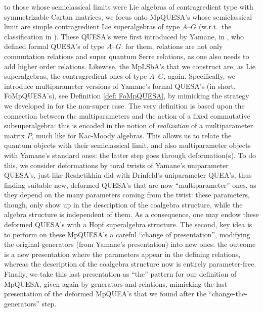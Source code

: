 \documentclass[12pt,reqno,twoside,a4paper]{amsart}
\numberwithin{equation}{section}
\theoremstyle{definition}
\newtheorem{free text}[lema]{}
\theoremstyle{remark}
\theoremstyle{plain}
\begin{document}
 to those whose semiclassical limits were Lie algebras of contragredient
type with symmetrizable Cartan matrices, we focus onto MpQUESA's whose semiclassical limit are simple contragredient Lie superalgebras of type  $ A $--$ G $
(w.r.t.\ the classification in  \cite{Ka2}).  These QUESA's were first introduced by
Yamane, in  \cite{Ya1},  who defined formal QUESA's of type  $ A $--$ G $:  for them, relations are not only commutation relations and super quantum Serre relations, as one also needs to add higher order relations.
Likewise, the MpLSbA's that we construct are, as Lie superalgebras, the contragredient ones of type  $ A $--$ G $,  again.
%
 \vskip5pt
%
   Specifically, we introduce multiparameter versions of Yamane's formal QUESA's  (in short, FoMpQUESA's), see  Definition \ref{def: FoMpQUESA},  by mimicking the strategy we developed in  \cite{GG3}  for the non-super case.  The very definition is based upon the connection between
the multiparameters and the action of a fixed commutative subsuperalgebra:
this is encoded in the notion of  \textit{realization\/}  of a multiparameter matrix  $ P $,
much like for Kac-Moody algebras. This allows us to relate the quantum objects
with their semiclassical limit, and also multiparameter objects with Yamane's standard ones:
the latter step goes through deformation(s).
%
%
 To do this, we consider deformations by toral twists of Yamane's uniparameter QUESA's,
just like Reshetikhin did with Drinfeld's uniparameter QUEA's, thus finding suitable new, deformed QUESA's that are now ``multiparameter'' ones, as they depend on the many parameters coming from the twist:
 these parameters, though, only show up in the description of the coalgebra structure,
 while the algebra structure is independent of them.
 As a consequence, one may endow these deformed QUESA's with a Hopf superalgebra
structure.
The second, key idea is to perform on these MpQUESA's a careful ``change of presentation'',
modifying the original generators (from Yamane's presentation) into new ones: the outcome is a
new presentation where the parameters appear in the defining relations, whereas the description
of the coalgebra structure now is entirely parameter-free.  Finally, we take this last presentation as
``the'' pattern for our definition of MpQUESA, given again by generators and relations,
mimicking the last presentation of the deformed MpQUEA's that we found after the ``change-the-generators'' step.
\end{document}
